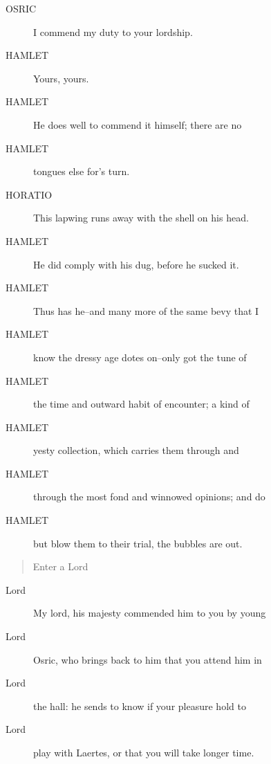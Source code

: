 \documentclass{article}
\begin{document}
\begin{description}
            
\item[OSRIC] I commend my duty to your lordship.
\end{description}
          
\begin{description}
            
\item[HAMLET] Yours, yours.
\item[HAMLET] He does well to commend it himself; there are no
\item[HAMLET] tongues else for's turn.
\end{description}
          
\begin{description}
            
\item[HORATIO] This lapwing runs away with the shell on his head.
\end{description}
          
\begin{description}
            
\item[HAMLET] He did comply with his dug, before he sucked it.
\item[HAMLET] Thus has he--and many more of the same bevy that I
\item[HAMLET] know the dressy age dotes on--only got the tune of
\item[HAMLET] the time and outward habit of encounter; a kind of
\item[HAMLET] yesty collection, which carries them through and
\item[HAMLET] through the most fond and winnowed opinions; and do
\item[HAMLET] but blow them to their trial, the bubbles are out.
\end{description}
          
\begin{quote}
Enter a Lord
\end{quote}
          
\begin{description}
            
\item[Lord] My lord, his majesty commended him to you by young
\item[Lord] Osric, who brings back to him that you attend him in
\item[Lord] the hall: he sends to know if your pleasure hold to
\item[Lord] play with Laertes, or that you will take longer time.
\end{description}
          
\end{document}
